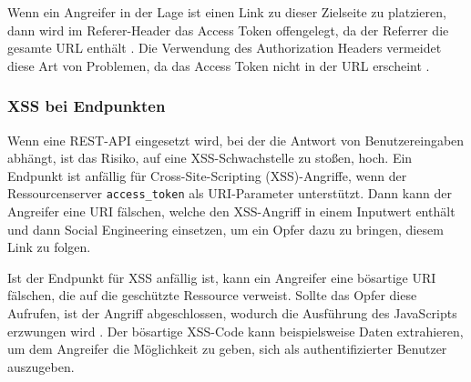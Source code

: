 
Wenn ein Angreifer in der Lage ist einen Link zu dieser Zielseite zu platzieren, dann wird im Referer-Header das Access Token offengelegt, da der Referrer die gesamte URL enthält  \cite{OAuth2inAction}. Die Verwendung des Authorization Headers vermeidet diese Art von Problemen, da das Access Token nicht in der URL erscheint \cite{OAuth2inAction}.


\subsubsection{XSS bei Endpunkten}

Wenn eine REST-API eingesetzt wird, bei der die Antwort von Benutzereingaben abhängt, ist das Risiko, auf eine XSS-Schwachstelle zu stoßen, hoch. Ein Endpunkt ist anfällig für Cross-Site-Scripting (XSS)-Angriffe, wenn der Ressourcenserver \texttt{access\_token} als URI-Parameter unterstützt. Dann kann der Angreifer eine URI fälschen, welche den XSS-Angriff in einem Inputwert enthält und dann Social Engineering einsetzen, um ein Opfer dazu zu bringen, diesem Link zu folgen. \cite{OAuth2inAction}

Ist der Endpunkt für XSS anfällig ist, kann ein Angreifer eine bösartige URI fälschen, die auf die geschützte Ressource verweist. Sollte das Opfer diese Aufrufen, ist der Angriff abgeschlossen, wodurch die Ausführung des JavaScripts erzwungen wird \cite{OAuth2inAction}. Der bösartige XSS-Code kann beispielsweise Daten extrahieren, um dem Angreifer die Möglichkeit zu geben, sich als authentifizierter Benutzer auszugeben. 

